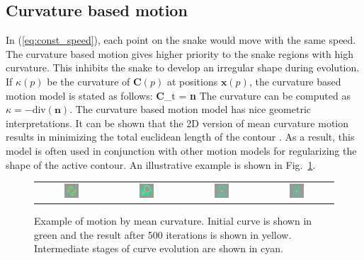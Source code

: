 \subsection{Curvature based motion}
In (\ref{eq:const_speed}), each point on the snake would move with the same speed. The curvature based motion gives higher priority to the snake regions with high curvature. This inhibits the snake to develop an irregular shape during evolution. If $\kappa(p)$ be the curvature of $\textbf{C}(p)$ at positions $\textbf{x}(p)$, the curvature based motion model is stated as follows:
\bea
\textbf{C}_t = \kappa\;\textbf{n}
\label{eq:curvature_motion}
\eea
The curvature can be computed as $\kappa=-\text{div}\left(\textbf{n}\right)$. The curvature based motion model has nice geometric interpretations. It can be shown that the 2D version of mean curvature motion results in minimizing the total euclidean length of the contour \cite{grayson1987heat}. As a result, this model is often used in conjunction with other motion models for regularizing the shape of the active contour. An illustrative example is shown in Fig.~\ref{fig:mean_curvature_demo}.
\begin{figure}[t]
\centering
\begin{tabular}{cccc}
\includegraphics[width=0.22\textwidth]{images/demo/curvature_flow/curvature_flow5}	&
\includegraphics[width=0.22\textwidth]{images/demo/curvature_flow/curvature_flow6}	&
\includegraphics[width=0.22\textwidth]{images/demo/curvature_flow/curvature_flow7}	&
\includegraphics[width=0.22\textwidth]{images/demo/curvature_flow/curvature_flow8}
\end{tabular}
\caption[Motion by mean curvature.]{Example of motion by mean curvature. Initial curve is shown in green and the result after 500 iterations is shown in yellow. Intermediate stages of curve evolution are shown in cyan.}
\label{fig:mean_curvature_demo}
\end{figure}
